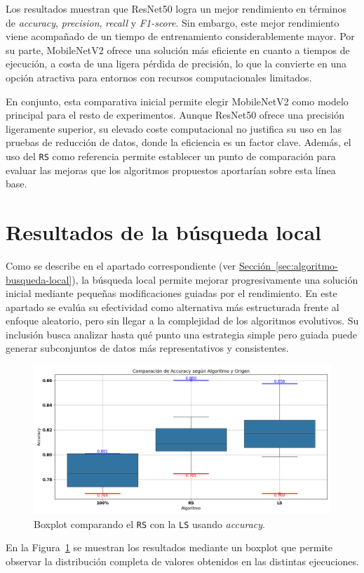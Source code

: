 Los resultados muestran que ResNet50 logra un mejor rendimiento en términos de \textit{accuracy}, \textit{precision}, \textit{recall} y \textit{F1-score}.
Sin embargo, este mejor rendimiento viene acompañado de un tiempo de entrenamiento considerablemente mayor.
Por su parte, MobileNetV2 ofrece una solución más eficiente en cuanto a tiempos de ejecución, a costa de una ligera pérdida de precisión,
lo que la convierte en una opción atractiva para entornos con recursos computacionales limitados.

En conjunto, esta comparativa inicial permite elegir MobileNetV2 como modelo principal para el resto de experimentos.
Aunque ResNet50 ofrece una precisión ligeramente superior, su elevado coste computacional no justifica su uso en las pruebas de reducción de datos,
donde la eficiencia es un factor clave.
Además, el uso del \texttt{RS} como referencia permite establecer un punto de comparación para evaluar las mejoras que los algoritmos propuestos aportarían sobre esta línea base.


\section{Resultados de la búsqueda local}\label{sec:resultados-busqueda-local}
Como se describe en el apartado correspondiente (ver \hyperref[sec:algoritmo-busqueda-local]{Sección~\ref*{sec:algoritmo-busqueda-local}}),
la búsqueda local permite mejorar progresivamente una solución inicial mediante pequeñas modificaciones guiadas por el rendimiento.
En este apartado se evalúa su efectividad como alternativa más estructurada frente al enfoque aleatorio, pero sin llegar a la complejidad de los algoritmos evolutivos.
Su inclusión busca analizar hasta qué punto una estrategia simple pero guiada puede generar subconjuntos de datos más representativos y consistentes.

\begin{figure}[htp]
    \centering
    \includegraphics[width=1\textwidth]{imagenes/evaluaciones/comparacion_rs-ls.png}
    \caption{Boxplot comparando el \texttt{RS} con la \texttt{LS} usando \textit{accuracy}.}
    \label{fig:aleatorio-vs-busqueda-local}
\end{figure}
En la Figura~\ref{fig:aleatorio-vs-busqueda-local} se muestran los resultados mediante un boxplot que permite observar
la distribución completa de valores obtenidos en las distintas ejecuciones.

